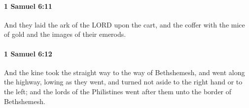 		\paragraph{1 Samuel 6:11} %
			\label{1SAMUEL-6-11}

			And they laid the ark of the LORD upon the cart, and the coffer with the mice of gold and the images of their emerods.


		\paragraph{1 Samuel 6:12} %
			\label{1SAMUEL-6-12}

			And the kine took the straight way to the way of Bethshemesh, and went along the highway, lowing as they went, and turned not aside to the right hand or to the left; and the lords of the Philistines went after them unto the border of Bethshemesh.


